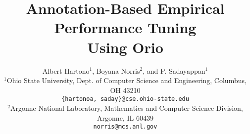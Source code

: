 \documentclass[12pt]{article}
\date{}
\title{\vspace{-.6in}Annotation-Based Empirical Performance Tuning\\ Using Orio}
\author{
Albert Hartono$^1$, Boyana Norris$^2$, and P. Sadayappan$^1$ \\
{\small $^1$Ohio State University, Dept. of Computer Science and Engineering, Columbus, OH 43210}\\
{\small \texttt{\{hartonoa, saday\}@cse.ohio-state.edu}}\\
{\small $^2$Argonne National Laboratory, Mathematics and Computer Science Division, Argonne, IL 60439}\\
{\small \texttt{norris@mcs.anl.gov}}
}
\begin{document}
\maketitle

\begin{abstract}

\end{abstract}





 
 

\small
 

\end{document}
